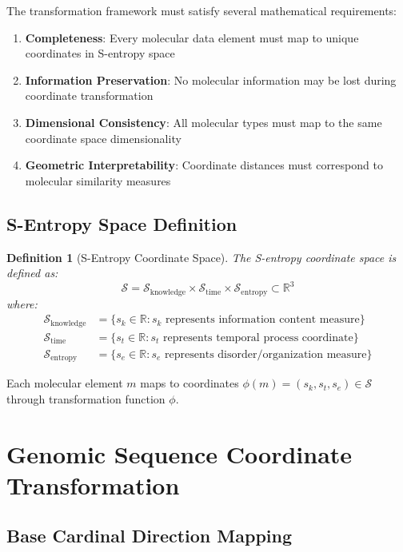 \documentclass[12pt,a4paper]{article}
\newtheorem{definition}{Definition}
\begin{document}
The transformation framework must satisfy several mathematical requirements:

\begin{enumerate}
\item \textbf{Completeness}: Every molecular data element must map to unique coordinates in S-entropy space
\item \textbf{Information Preservation}: No molecular information may be lost during coordinate transformation
\item \textbf{Dimensional Consistency}: All molecular types must map to the same coordinate space dimensionality
\item \textbf{Geometric Interpretability}: Coordinate distances must correspond to molecular similarity measures
\end{enumerate}

\subsection{S-Entropy Space Definition}

\begin{definition}[S-Entropy Coordinate Space]
The S-entropy coordinate space is defined as:
$$\mathcal{S} = \mathcal{S}_{\text{knowledge}} \times \mathcal{S}_{\text{time}} \times \mathcal{S}_{\text{entropy}} \subset \mathbb{R}^3$$
where:
\begin{align}
\mathcal{S}_{\text{knowledge}} &= \{s_k \in \mathbb{R} : s_k \text{ represents information content measure}\} \\
\mathcal{S}_{\text{time}} &= \{s_t \in \mathbb{R} : s_t \text{ represents temporal process coordinate}\} \\
\mathcal{S}_{\text{entropy}} &= \{s_e \in \mathbb{R} : s_e \text{ represents disorder/organization measure}\}
\end{align}
\end{definition}

Each molecular element $m$ maps to coordinates $\phi(m) = (s_k, s_t, s_e) \in \mathcal{S}$ through transformation function $\phi$.

\section{Genomic Sequence Coordinate Transformation}

\subsection{Base Cardinal Direction Mapping}
\end{document}
